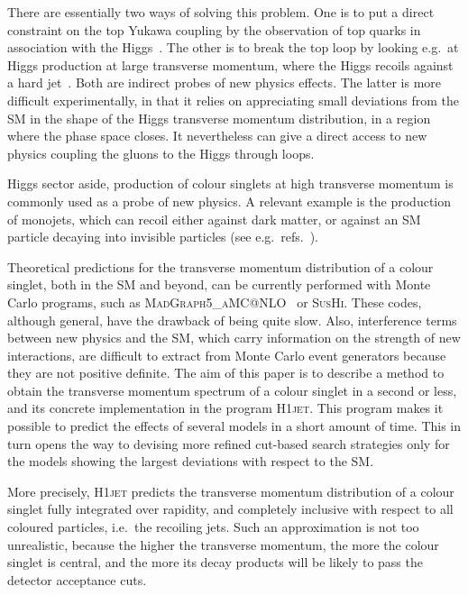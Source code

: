 \documentclass[12pt]{article}
\begin{document}
There are essentially two ways of solving this problem. One is to put
a direct constraint on the top Yukawa coupling by the
observation of top quarks in association with the
Higgs~\cite{Aad:2020ivc,Sirunyan:2020sum,Maltoni:2016yxb}. The other is
to break the top loop by looking e.g.\  at Higgs production at large
transverse momentum, where the Higgs recoils against a hard
jet~\cite{Azatov:2013xha,Grojean:2013nya,Banfi:2013yoa}. Both are
indirect probes of new physics effects. The latter is more difficult
experimentally, in that it relies on appreciating small deviations from
the SM in the shape of the Higgs transverse momentum distribution, in
a region where the phase space closes. It nevertheless can give a
direct access to new physics coupling the gluons to the Higgs through loops.

Higgs sector aside, production of colour singlets at high transverse
momentum is commonly used as a probe of new physics. A relevant
example is the production of monojets, which can recoil
either against dark matter, or against an SM particle decaying into
invisible particles (see e.g.\ refs.~\cite{Sirunyan:2017hci,Aaboud:2019yqu}).

Theoretical predictions for the transverse momentum distribution of a
colour singlet, both in the SM and beyond, can be currently performed
with Monte Carlo programs, such as
\textsc{MadGraph5\_aMC@NLO}~\cite{Alwall:2014hca} or
\textsc{SusHi}\cite{Harlander:2012pb,Harlander:2016hcx}. These codes,
although general, have the drawback of being quite slow. Also,
interference terms between new physics and the SM, which
carry information on the strength of new interactions, are difficult
to extract from Monte Carlo event generators because they are not positive
definite. The aim of this paper is to describe a method to obtain the
transverse momentum spectrum of a colour singlet in a second or less,
and its concrete implementation in the program \textsc{H1jet}. This program
makes it possible to predict the effects of several models in a short
amount of time. This in turn opens the way to devising more refined
cut-based search strategies only for the models showing the largest
deviations with respect to the SM.

More precisely, \textsc{H1jet} predicts the transverse momentum distribution of
a colour singlet fully integrated over rapidity, and completely
inclusive with respect to all coloured particles, i.e.\ the recoiling
jets. Such an approximation is not too unrealistic, because the higher the
transverse momentum, the more the colour singlet is central, and the
more its decay products will be likely to pass the detector acceptance
cuts.
\end{document}

